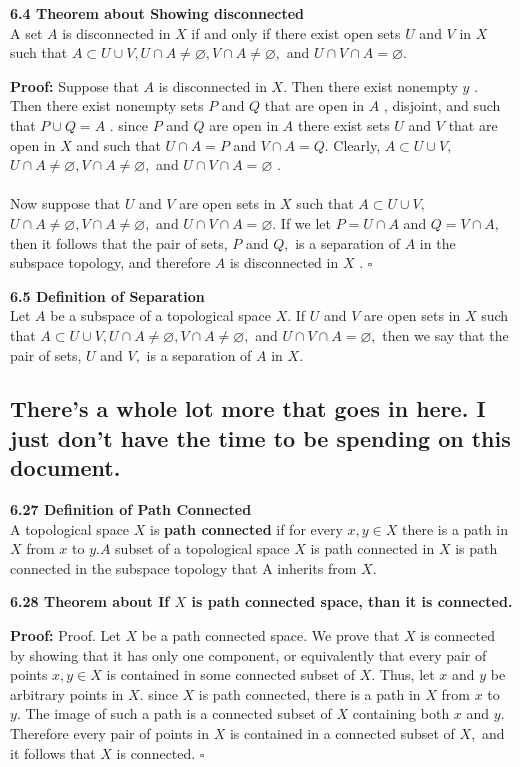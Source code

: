 \documentclass[12pt]{article}
\newenvironment{proofed}[1][]{\par \medskip \noindent \textbf{#1 Proof: }}{\hfill$\square$}
\newenvironment{defn}[2][]{\par \medskip \noindent \textbf{#1 Definition of \large#2 \medskip \\}}{\rmfamily \medskip}
\newenvironment{thm}[2][]{\par \medskip \noindent \textbf{#1 Theorem about \large#2 \medskip \\}}{\rmfamily \medskip}
\begin{document}
	\begin{thm}[6.4]{Showing disconnected}
		 A set $ A $ is disconnected in $X$ if and only if there exist open
		sets $U$ and $V$ in $X$ such that $A \subset U \cup V , U \cap A \neq \varnothing , V \cap A \neq \varnothing ,$ and
		$U \cap V \cap A = \varnothing .$
		\begin{proofed}
			Suppose that $A$ is disconnected in $X .$ Then there exist nonempty $y$ . Then there exist nonempty
			sets $P$ and $Q$ that are open in $A$ , disjoint, and such that $P \cup Q = A$ .
			since $P$ and $Q$ are open in $A$ there exist sets $U$ and $V$ that are open in $X$ and such that $U \cap A = P$ and $V \cap A = Q .$ Clearly, $A \subset U \cup V ,$
			$U \cap A \neq \varnothing , V \cap A \neq \varnothing ,$ and $U \cap V \cap A = \varnothing$ . \\
			\\
			Now suppose that $U$ and $V$ are open sets in $X$ such that $A \subset U \cup V ,$
			$U \cap A \neq \varnothing , V \cap A \neq \varnothing ,$ and $U \cap V \cap A = \varnothing .$ If we let $P = U \cap A$ and
			$Q = V \cap A ,$ then it follows that the pair of sets, $P$ and $Q ,$ is a separation
			of $A$ in the subspace topology, and therefore $A$ is disconnected in $X$ .
		\end{proofed}
	\end{thm}
	\begin{defn}[6.5]{Separation}
		Let $  A $ be a subspace of a topological space $ X $. If $U$ and
		$V$ are open sets in $X$ such that $A \subset U \cup V , U \cap A \neq \varnothing , V \cap A \neq \varnothing ,$ and $U \cap V \cap A = \varnothing ,$ then we say that the pair of sets, $U$ and $V ,$ is a separation
		of $A$ in $X .$
	\end{defn}
	\subsection*{There's a whole lot more that goes in here. I just don't have the time to be spending on this document.}
	\begin{defn}[6.27]{Path Connected}
		A topological space $X$ is \textbf{path connected} if for every $x , y \in X$ there is a path in $X$ from $x$ to $y . A$ subset of a topological space
		$X$ is path connected in $X$ is path connected in the subspace topology that
		A inherits from $X .$
	\end{defn}
	\begin{thm}[6.28]{If $ X $ is path connected space, than it is connected.}
		\begin{proofed}
			Proof. Let $X$ be a path connected space. We prove that $X$ is connected
			by showing that it has only one component, or equivalently that every pair
			of points $x , y \in X$ is contained in some connected subset of $X .$ Thus, let $x$ and $y$ be arbitrary points in $X .$ since $X$ is path connected, there is
			a path in $X$ from $x$ to $y .$ The image of such a path is a connected subset
			of $X$ containing both $x$ and $y .$ Therefore every pair of points in $X$ is
			contained in a connected subset of $X ,$ and it follows that $X$ is connected.
		\end{proofed}
	\end{thm}
	\\
\end{document}
